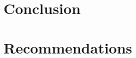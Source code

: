 
\section{Conclusion}
\label{conclusion:conclusion}

\section{Recommendations}
\label{conclusion:recommendations}
